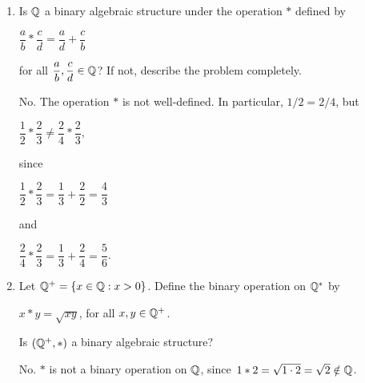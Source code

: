 \documentclass[11pt,fleqn,dvipsnames,usenames]{article}
\renewcommand{\headrulewidth}{1pt}
\newcommand{\p}{\noindent}
\begin{document}
\fancyhead[L]{\course}
\fancyhead[R]{\term}
\renewcommand{\headrulewidth}{0.4pt}

\p {\huge \S4.1 Problems}
\vsp

\begin{enumerate}[1.]
\item Is $\mathbb{Q}$ a binary algebraic structure under the operation $*$ defined by
\begin{center}
$\dfrac{a}{b}*\dfrac{c}{d} = \dfrac{a}{d} + \dfrac{c}{b}$
\end{center}
for all $\dfrac{a}{b},\dfrac{c}{d}\in \mathbb{Q}$?    If not, describe the problem completely.
\vsmsp

\solution No.  The operation $*$ is not well-defined.  In particular, $1/2 = 2/4$, but
\begin{center}
$\dfrac{1}{2}*\dfrac{2}{3} \neq \dfrac{2}{4}*\dfrac{2}{3}$,
\end{center}
since
\begin{center}
$\dfrac{1}{2}*\dfrac{2}{3} = \dfrac{1}{3} + \dfrac{2}{2} = \dfrac{4}{3}$
\end{center}
and
\begin{center}
$\dfrac{2}{4}*\dfrac{2}{3} = \dfrac{1}{3} + \dfrac{2}{4} = \dfrac{5}{6}$.
\end{center}
\item Let $\mathbb{Q}^{+} = \left\{x\in\mathbb{Q}:x > 0\right\}$.  Define the binary operation on $\mathbb{Q}^{*}$ by
\begin{center}
$x*y = \sqrt{xy}$, for all $x,y\in\mathbb{Q}^{+}$.
\end{center}
Is $(\mathbb{Q}^{+},*)$ a binary algebraic structure?
\vsmsp

\solution No.  $*$ is not a binary operation on $\mathbb{Q}$, since $1*2 = \sqrt{1\cdot 2} = \sqrt{2}\notin \mathbb{Q}$.


\end{enumerate}
\end{document}
